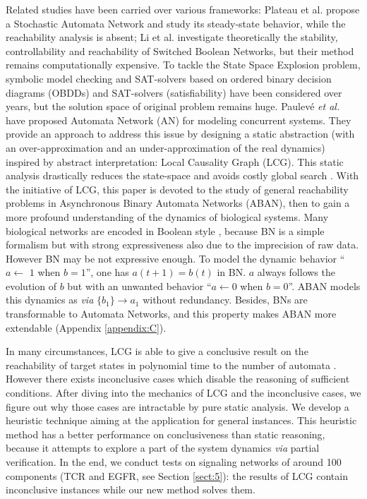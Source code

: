 \documentclass[runningheads]{llncs}
\newcommand{\ac}[3]{$\{#1\}\rightarrow#3$}
\begin{document}
Related studies have been carried over various frameworks: Plateau et al. \cite{plateau1991stochastic} propose a Stochastic Automata Network and study its steady-state behavior, while the reachability analysis is absent; Li et al. \cite{li2012reachability,li2014stability} investigate theoretically the stability, controllability and reachability of Switched Boolean Networks, but their method remains computationally expensive.  
To tackle the State Space Explosion problem, symbolic model checking \cite{burch1992symbolic} and SAT-solvers based on ordered binary decision diagrams (OBDDs) and SAT-solvers (satisfiability) \cite{abdulla2000symbolic} have been considered over years, but the solution space of original problem remains huge.
Paulev\'e \textit{et al.} \cite{folschette2015,pauleve2011} have proposed Automata Network (AN) for modeling concurrent systems. 
They provide an approach to address this issue by designing a static abstraction (with an over-approximation and an under-approximation of the real dynamics) inspired by abstract interpretation: Local Causality Graph (LCG). 
This static analysis drastically reduces the state-space and avoids costly global search \cite{pauleve2012}.
With the initiative of LCG, this paper is devoted to the study of general reachability problems in Asynchronous Binary Automata Networks (ABAN), then to gain a more profound understanding of the dynamics of biological systems. 
Many biological networks are encoded in Boolean style \cite{kauffman1969,akutsu2007control}, because BN is a simple formalism but with strong expressiveness also due to the imprecision of raw data.
However BN may be not expressive enough.
To model the dynamic behavior ``$a\gets$ $1$ when $b=1$'', one has $a(t+1)=b(t)$ in BN.
$a$ always follows the evolution of $b$ but with an unwanted behavior ``$a\gets 0$ when $b=0$''.
ABAN models this dynamics as \textit{via} \ac{b_1}{a_0}{a_1} without redundancy. 
Besides, BNs are transformable to Automata Networks, and this property makes ABAN more extendable (Appendix \ref{appendix:C}).

In many circumstances, LCG is able to give a conclusive result on the reachability of target states in polynomial time to the number of automata \cite{pauleve2016goal}. 
However there exists inconclusive cases which disable the reasoning of sufficient conditions.
After diving into the mechanics of LCG and the inconclusive cases, we figure out why those cases are intractable by pure static analysis. 
We develop a heuristic technique aiming at the application for general instances. 
This heuristic method has a better performance on conclusiveness than static reasoning, because it attempts to explore a part of the system dynamics \textit{via} partial verification.
In the end, we conduct tests on signaling networks of around 100 components (TCR and EGFR, see Section \ref{sect:5}): the results of LCG contain inconclusive instances \cite{folschette2015} while our new method solves them.
\end{document}
